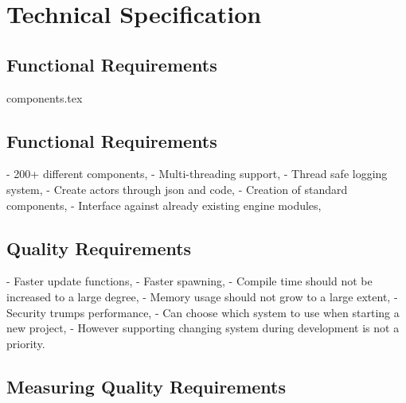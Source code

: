 \documentclass{article}
\begin{document}

\section*{Technical Specification}
\subsection*{Functional Requirements}
{components.tex}

\subsection*{Functional Requirements}
- 200+ different components,
- Multi-threading support,
- Thread safe logging system,
- Create actors through json and code,
- Creation of standard components,
- Interface against already existing engine modules,

\subsection*{Quality Requirements}
- Faster update functions,
- Faster spawning,
- Compile time should not be increased to a large degree,
- Memory usage should not grow to a large extent,
- Security trumps performance, 
- Can choose which system to use when starting a new project,
    - However supporting changing system during development is not a priority.

\subsection*{Measuring Quality Requirements}
\end{document}
